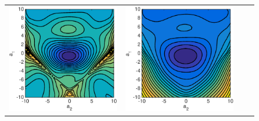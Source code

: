 \documentclass{iopart}
\begin{document}
\begin{figure}
\centering
\begin{tabular}{cccc}
\includegraphics[scale=.2]{./figs/2D_exp0_i}&
\includegraphics[scale=.2]{./figs/2D_exp0_j}&

\end{tabular}
\end{figure}
\end{document}
